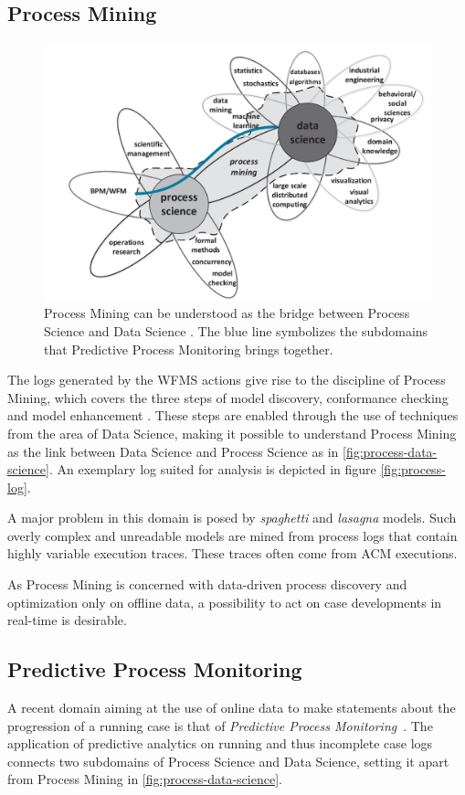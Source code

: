 \subsection{Process Mining}
\begin{figure}
    \centering
    \includegraphics[width=\textwidth]{gfx/process-data-science.png}
    \caption{Process Mining can be understood as the bridge between Process Science and Data Science \cite[p.18]{Aalst2016}. The blue line symbolizes the subdomains that Predictive Process Monitoring brings together.}
    \label{fig:process-data-science}
\end{figure}

The logs generated by the WFMS actions give rise to the discipline of Process Mining, which covers the three steps of model discovery, conformance checking and model enhancement \cite{Aalst2016}. These steps are enabled through the use of techniques from the area of Data Science, making it possible to understand Process Mining as the link between Data Science and Process Science as in \autoref{fig:process-data-science}. An exemplary log suited for analysis is depicted in figure \ref{fig:process-log}.

A major problem in this domain is posed by \textit{spaghetti} and \textit{lasagna} models. Such overly complex and unreadable models are mined from process logs that contain highly variable execution traces. These traces often come from ACM executions.

As Process Mining is concerned with data-driven process discovery and optimization only on offline data, a possibility to act on case developments in real-time is desirable.

\newpage
\subsection{Predictive Process Monitoring}
A recent domain aiming at the use of online data to make statements about the progression of a running case is that of \textit{Predictive Process Monitoring}~\cite{francescomarino2015, schoenig2018}. The application of predictive analytics on running and thus incomplete case logs connects two subdomains of Process Science and Data Science, setting it apart from Process Mining in \autoref{fig:process-data-science}.

